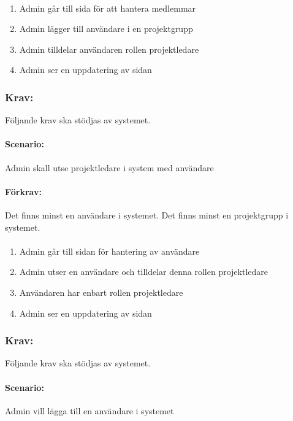 \documentclass[paper=a4, fontsize=11pt,twoside]{article}
\begin{document}
\paragraph{}
\begin{enumerate}
\item Admin går till sida för att hantera medlemmar
\item Admin lägger till användare i en projektgrupp
\item Admin tilldelar användaren rollen projektledare
\item Admin ser en uppdatering av sidan
\end{enumerate}

\subsubsection{Krav:} Följande krav ska stödjas av systemet. 
\paragraph{Scenario:}
Admin skall utse projektledare i system med användare
\paragraph{Förkrav:}
Det finns minst en användare i systemet. Det finns minst en projektgrupp i systemet.
\paragraph{}
\begin{enumerate}
\item Admin går till sidan för hantering av användare
\item Admin utser en användare och tilldelar denna rollen projektledare
\item Användaren har enbart rollen projektledare
\item Admin ser en uppdatering av sidan
\end{enumerate}

\subsubsection{Krav:} Följande krav ska stödjas av systemet. 
\paragraph{Scenario:}
Admin vill lägga till en användare i systemet
\end{document}
